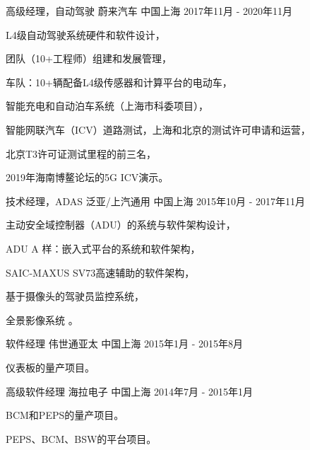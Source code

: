 \documentclass[../cv_xin_cn.tex]{subfiles}
\begin{document}
\begin{cventries}
  \cventry
    {高级经理，自动驾驶} %
    {蔚来汽车} %
    {中国上海} %
    {2017年11月 - 2020年11月} %
    {
      \begin{cvitems}
        \item L4级自动驾驶系统硬件和软件设计，
        \item 团队（10+工程师）组建和发展管理，
        \item 车队：10+辆配备L4级传感器和计算平台的电动车，
        \item 智能充电和自动泊车系统（上海市科委项目），
        \item 智能网联汽车（ICV）道路测试，上海和北京的测试许可申请和运营，
        \item 北京T3许可证测试里程的前三名，
        \item 2019年海南博鳌论坛的5G ICV演示。
      \end{cvitems}
    }

  \cventry
    {技术经理，ADAS} %
    {泛亚/上汽通用} %
    {中国上海} %
    {2015年10月 - 2017年11月} %
    {
      \begin{cvitems}
        \item 主动安全域控制器（ADU）的系统与软件架构设计，
        \item ADU A 样：嵌入式平台的系统和软件架构，
        \item SAIC-MAXUS SV73高速辅助的软件架构，
        \item 基于摄像头的驾驶员监控系统，
        \item 全景影像系统 \supercite{Xin_RearView_17}。
      \end{cvitems}
    }


  \cventry
    {软件经理} %
    {伟世通亚太} %
    {中国上海} %
    {2015年1月 - 2015年8月} %
    {
      \begin{cvitems}
        \item 仪表板的量产项目。
      \end{cvitems}
    }

  \cventry
    {高级软件经理} %
    {海拉电子} %
    {中国上海} %
    {2014年7月 - 2015年1月} %
    {
      \begin{cvitems}
        \item BCM和PEPS的量产项目。
        \item PEPS、BCM、BSW的平台项目。
      \end{cvitems}
    }


\end{cventries}
\end{document}
